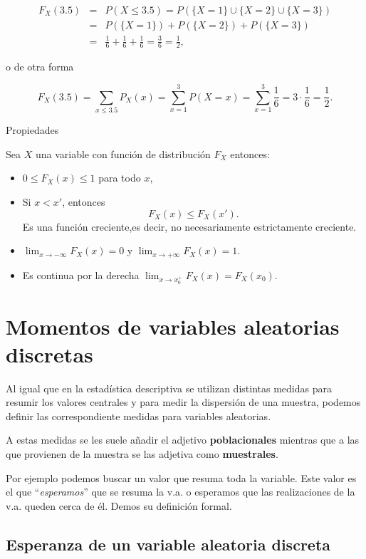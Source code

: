 \documentclass[
  letterpaper,
  DIV=11,
  numbers=noendperiod]{scrreprt}
\providecommand{\tightlist}{%
  \setlength{\itemsep}{0pt}\setlength{\parskip}{0pt}}\usepackage{longtable,booktabs,array}
\begin{document}
\begin{eqnarray*}
F_{X}(3.5) & = & P(X\leq 3.5)=  P(\{X=1\}\cup\{X=2\}\cup \{X=3\})\\
&=& P(\{X=1\})+P(\{X=2\})+P(\{X=3\})\\
&=& \frac16+\frac16+\frac16=\frac36 =\frac12,
\end{eqnarray*}

o de otra forma

\[F_{X}(3.5)=\sum_{x\leq 3.5} P_X(x)=\sum_{x=1}^3 P(X=x)=\sum_{x=1}^3 \frac16= 3 \cdot
   \frac16=\frac12.
\]

Propiedades

Sea \(X\) una variable con función de distribución \(F_{X}\) entonces:

\begin{itemize}
\tightlist
\item
  \(0\leq F_{X}(x)\leq 1\) para todo \(x\),
\item
  Si \(x<x'\), entonces \[F_{X}(x)\leq F_{X}(x').\] Es una función
  creciente,es decir, no necesariamente estrictamente creciente.
\item
  \(\displaystyle \lim_{x\to -\infty}F_{X}(x)=0\) y
  \(\displaystyle \lim_{x\to +\infty}F_{X}(x)=1.\)
\item
  Es continua por la derecha
  \(\displaystyle \lim_{x\to x_0^{+}}F_{X}(x)=F_{X}(x_0)\).
\end{itemize}

\section{Momentos de variables aleatorias
discretas}\label{momentos-de-variables-aleatorias-discretas}

Al igual que en la estadística descriptiva se utilizan distintas medidas
para resumir los valores centrales y para medir la dispersión de una
muestra, podemos definir las correspondiente medidas para variables
aleatorias.

A estas medidas se les suele añadir el adjetivo \textbf{poblacionales}
mientras que a las que provienen de la muestra se las adjetiva como
\textbf{muestrales}.

Por ejemplo podemos buscar un valor que resuma toda la variable. Este
valor es el que ``\emph{esperamos}'' que se resuma la v.a. o esperamos
que las realizaciones de la v.a. queden cerca de él. Demos su definición
formal.

\subsection{Esperanza de un variable aleatoria
discreta}\label{esperanza-de-un-variable-aleatoria-discreta}
\end{document}
